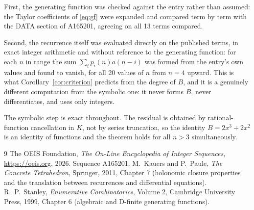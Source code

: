 \documentclass[11pt,a4paper]{article}
\theoremstyle{plain}
\theoremstyle{definition}
\begin{document}
First, the generating function was checked against the entry rather than assumed: the
Taylor coefficients of \eqref{eq:gf} were expanded and compared term by term with the DATA
section of A165201, agreeing on all 13 terms compared.

Second, the recurrence itself was evaluated directly on the published terms, in exact
integer arithmetic and without reference to the generating function: for each $n$ in range
the sum $\sum_{i}p_{i}(n)a(n-i)$ was formed from the entry's own values and found to
vanish, for all 20 values of $n$ from $n=4$ upward. This is what
Corollary~\ref{cor:criterion} predicts from the degree of $B$, and it is a genuinely
different computation from the symbolic one: it never forms $B$, never differentiates, and
uses only integers.

The symbolic step is exact throughout. The residual is obtained by rational-function
cancellation in $K$, not by series truncation, so the identity $B=2 x^{3} + 2 x^{2}$ is an
identity of functions and the theorem holds for all $n>3$ simultaneously.

\begin{thebibliography}{9}
 The OEIS Foundation, \emph{The On-Line Encyclopedia of Integer Sequences},
\url{https://oeis.org}, 2026. Sequence A165201.
 M.~Kauers and P.~Paule, \emph{The Concrete Tetrahedron}, Springer, 2011,
Chapter 7 (holonomic closure properties and the translation between recurrences and
differential equations).
 R.~P.~Stanley, \emph{Enumerative Combinatorics}, Volume 2, Cambridge
University Press, 1999, Chapter 6 (algebraic and D-finite generating functions).
\end{thebibliography}
\end{document}
